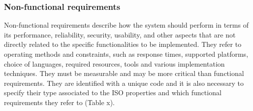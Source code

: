 \subsubsection{Non-functional requirements}
Non-functional requirements describe how the system should perform in terms of its performance,
reliability, security, usability, and other aspects that are not directly related to the specific
functionalities to be implemented. They refer to operating methods and constraints, such as response
times, supported platforms, choice of languages, required resources, tools and various
implementation techniques. They must be measurable and may be more critical than functional
requirements. They are identified with a unique code and it is also necessary to specify their type
associated to the ISO properties and which functional requirements they refer to (Table x).



